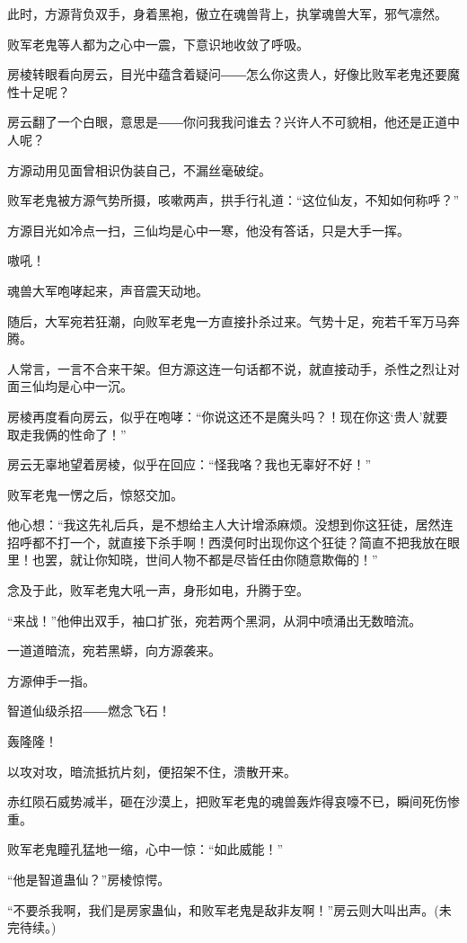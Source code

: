 \begin{this_body}
此时，方源背负双手，身着黑袍，傲立在魂兽背上，执掌魂兽大军，邪气凛然。

败军老鬼等人都为之心中一震，下意识地收敛了呼吸。

房棱转眼看向房云，目光中蕴含着疑问――怎么你这贵人，好像比败军老鬼还要魔性十足呢？

房云翻了一个白眼，意思是――你问我我问谁去？兴许人不可貌相，他还是正道中人呢？

方源动用见面曾相识伪装自己，不漏丝毫破绽。

败军老鬼被方源气势所摄，咳嗽两声，拱手行礼道：“这位仙友，不知如何称呼？”

方源目光如冷点一扫，三仙均是心中一寒，他没有答话，只是大手一挥。

嗷吼！

魂兽大军咆哮起来，声音震天动地。

随后，大军宛若狂潮，向败军老鬼一方直接扑杀过来。气势十足，宛若千军万马奔腾。

人常言，一言不合来干架。但方源这连一句话都不说，就直接动手，杀性之烈让对面三仙均是心中一沉。

房棱再度看向房云，似乎在咆哮：“你说这还不是魔头吗？！现在你这‘贵人’就要取走我俩的性命了！”

房云无辜地望着房棱，似乎在回应：“怪我咯？我也无辜好不好！”

败军老鬼一愣之后，惊怒交加。

他心想：“我这先礼后兵，是不想给主人大计增添麻烦。没想到你这狂徒，居然连招呼都不打一个，就直接下杀手啊！西漠何时出现你这个狂徒？简直不把我放在眼里！也罢，就让你知晓，世间人物不都是尽皆任由你随意欺侮的！”

念及于此，败军老鬼大吼一声，身形如电，升腾于空。

“来战！”他伸出双手，袖口扩张，宛若两个黑洞，从洞中喷涌出无数暗流。

一道道暗流，宛若黑蟒，向方源袭来。

方源伸手一指。

智道仙级杀招――燃念飞石！

轰隆隆！

以攻对攻，暗流抵抗片刻，便招架不住，溃散开来。

赤红陨石威势减半，砸在沙漠上，把败军老鬼的魂兽轰炸得哀嚎不已，瞬间死伤惨重。

败军老鬼瞳孔猛地一缩，心中一惊：“如此威能！”

“他是智道蛊仙？”房棱惊愕。

“不要杀我啊，我们是房家蛊仙，和败军老鬼是敌非友啊！”房云则大叫出声。(未完待续。)

\end{this_body}

